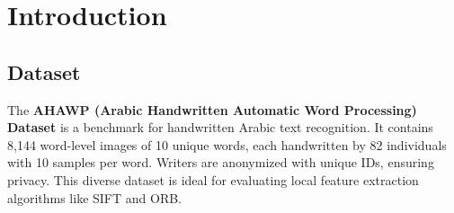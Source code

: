 \documentclass[12pt]{article}
\begin{document}
\clearpage


\tableofcontents
\clearpage

\listoffigures

\clearpage

\listoftables
\clearpage



\setlength{\parskip}{\baselineskip}%


\section{Introduction}

\subsection{Dataset}
The \textbf{AHAWP (Arabic Handwritten Automatic Word Processing) Dataset} is a benchmark for handwritten Arabic text recognition. It contains 8,144 word-level images of 10 unique words, each handwritten by 82 individuals with 10 samples per word. Writers are anonymized with unique IDs, ensuring privacy. This diverse dataset is ideal for evaluating local feature extraction algorithms like SIFT and ORB.
\end{document}

